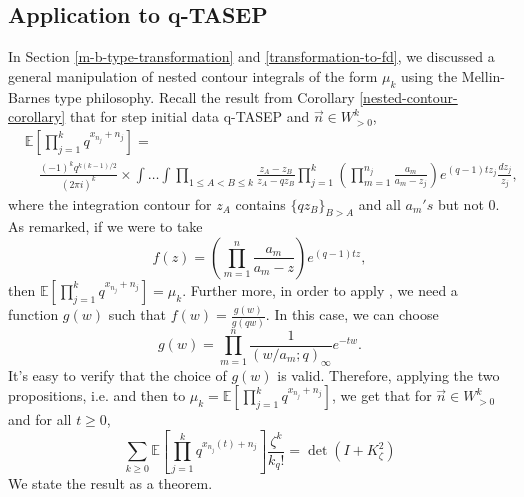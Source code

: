 \subsection{Application to q-TASEP}
\label{mb-application-to-qtasep}
In Section \ref{m-b-type-transformation} and \ref{transformation-to-fd}, we discussed a general manipulation of nested contour integrals of the form $\mu_k$ using the Mellin-Barnes type philosophy. Recall the result from Corollary \ref{nested-contour-corollary} that for step initial data q-TASEP and $\vec{n} \in W^k_{>0}$, 
\begin{align*}
& \mathbb{E} \left[ \prod_{j=1}^k q^{x_{n_j}+n_j} \right] = \\
& \quad \frac{(-1)^k q^{k(k-1)/2}}{(2 \pi i)^k} \times \int \dots \int \prod_{1 \le A < B \le k} \frac{z_A - z_B}{z_A - qz_B} \prod_{j=1}^k \left( \prod_{m=1}^{n_j} \frac{a_m}{a_m - z_j}\right) e^{(q-1)tz_j} \frac{dz_j}{z_j},
\end{align*}
where the integration contour for $z_A$ contains $\{qz_B\}_{B > A}$ and all $a_m's$ but not $0$. As remarked, if we were to take $$f(z) = \left( \prod_{m=1}^{n} \frac{a_m}{a_m - z} \right) e^{(q-1)tz},$$ then $\mathbb{E} \left[ \prod_{j=1}^k q^{x_{n_j}+n_j} \right] = \mu_k$. Further more, in order to apply , we need a function $g(w)$ such that $f(w) = \frac{g(w)}{g(qw)}$. In this case, we can choose $$g(w) = \prod_{m=1}^{n} \frac{1}{(w/a_m; q)_{\infty}} e^{-tw}.$$ It's easy to verify that the choice of $g(w)$ is valid. Therefore, applying the two propositions, i.e.  and then  to $\mu_k = \mathbb{E} \left[ \prod_{j=1}^k q^{x_{n_j}+n_j} \right]$, we get that for $\vec{n} \in W^k_{>0}$ and for all $t \ge 0$,
\begin{equation}
\label{m-b-application-to-qtasep-raw}
\sum_{k \ge 0} \mathbb{E} \left[ \prod_{j=1}^k q^{x_{n_j}(t)+n_j} \right] \frac{\zeta^k}{k_q!} = \det(I+K^2_{\zeta})
\end{equation}
We state the result as a theorem. 
